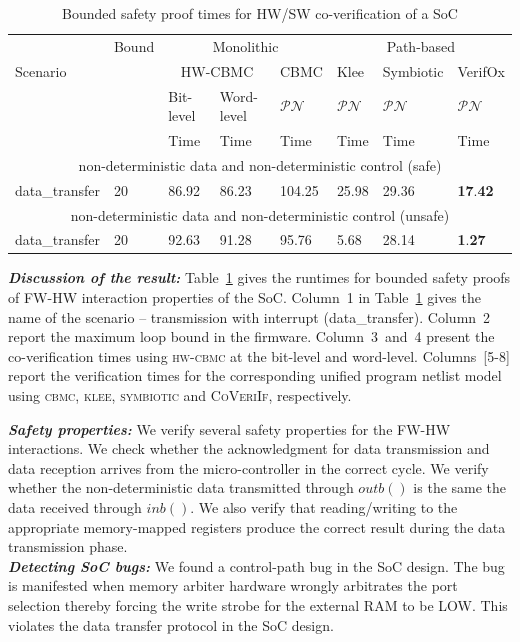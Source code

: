 \documentclass[sigconf]{acmart}
\newcommand{\tool}[1]{\textsc{#1}\xspace}
\newcommand{\cbmcv}{\tool{cbmc}}
\newcommand{\hwcbmcv}{\tool{hw-cbmc}}
\newcommand{\verifox}{\tool{CoVeriIf}}
\newcommand{\klee}{\tool{klee}}
\begin{document}
\begin{table}
\begin{center}
{
\begin{tabular}{|l|l|l|l|l|l|l|l|}
\hline
  & Bound & \multicolumn{3}{c|}{Monolithic} & \multicolumn{3}{c|}{Path-based} \\ 
\cline{3-8}
 Scenario &  & \multicolumn{2}{c|}{HW-CBMC} & CBMC & Klee & Symbiotic & VerifOx \\ 
\cline{3-8}
      &       &  Bit-level & Word-level & $\mathcal{PN}$ & $\mathcal{PN}$ & $\mathcal{PN}$ & $\mathcal{PN}$ \\
\cline{1-8}
      &       &   Time     &   Time      & Time  &  Time & Time & Time \\
\cline{1-8}      
\multicolumn{8}{|c|}{non-deterministic data and non-deterministic control (safe)} \\ \hline
data\_transfer & 20 & 86.92 & 86.23 & 104.25 & 25.98 & 29.36 &
\textbf{17}.\textbf{42} \\ 
\hline
\multicolumn{8}{|c|}{non-deterministic data and non-deterministic control
(unsafe)} \\ \hline
data\_transfer & 20 & 92.63 & 91.28 & 95.76 & 5.68 & 28.14 &
\textbf{1}.\textbf{27} \\ 
\hline
\end{tabular}
}
\end{center}
\vspace{-1.3mm}
\caption{Bounded safety proof times for HW/SW co-verification of a SoC 
\label{table:SoC}}
\end{table}

\textbf{\emph{Discussion of the result:}}
%
Table~\ref{table:SoC} gives the runtimes for bounded safety proofs of 
FW-HW interaction properties of the SoC.  Column~1 in
Table~\ref{table:SoC} gives the name of the scenario -- transmission with
interrupt (data\_transfer).  Column~2 report the maximum loop bound in the
firmware.  Column~3~and~4 present the co-verification times using \hwcbmcv
at the bit-level and word-level.  Columns~[5-8] report the
verification times for the corresponding unified program netlist model using
\cbmcv, \klee, \textsc{symbiotic} and \verifox, respectively.  

\textbf{\emph{Safety properties:}}
%
We verify several safety properties for the FW-HW interactions.  We check
whether the acknowledgment for data transmission and data reception arrives
from the micro-controller in the correct cycle.  We verify whether the
non-deterministic data transmitted through $outb()$ is the same
the data received through $inb()$.  We also verify that
reading/writing to the appropriate memory-mapped registers produce the
correct result during the data transmission phase.\\ \textbf{\emph{Detecting
SoC bugs:}} We found a control-path bug in the SoC design.  The bug is
manifested when memory arbiter hardware wrongly arbitrates the port
selection thereby forcing the write strobe for the external RAM to be LOW. 
This violates the data transfer protocol in the SoC design.
\end{document}
